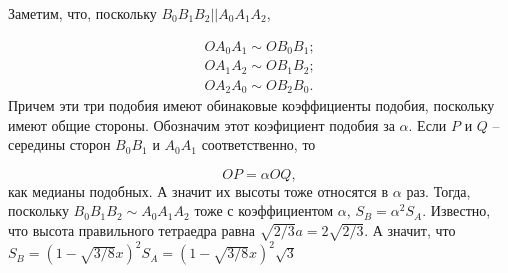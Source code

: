 
Заметим, что, поскольку $B_0B_1B_2 || A_0A_1A_2$, 

\begin{align*}
OA_0A_1 \sim OB_0B_1; \\
OA_1A_2 \sim OB_1B_2; \\
OA_2A_0 \sim OB_2B_0.
\end{align*}
Причем эти три подобия имеют обинаковые коэффициенты подобия, поскольку имеют общие стороны. Обозначим этот коэфициент подобия за $\alpha$. Если $P$ и $Q$ -- середины сторон $B_0B_1$ и $A_0A_1$ соответственно, то 

\begin{equation}
OP = \alpha OQ,
\end{equation}
как медианы подобных. А значит их высоты тоже относятся в $\alpha$ раз. Тогда, поскольку $B_0B_1B_2 \sim A_0A_1A_2$ тоже с коэффициентом $\alpha$, $S_B = \alpha^2 S_A$. Известно, что высота правильного тетраедра равна $\sqrt{2/3}a = 2\sqrt{2/3}$. А значит, что $S_B={(1 - \sqrt{3/8}x)}^2 S_A = {(1 - \sqrt{3/8}x)}^2 \sqrt{3}$
